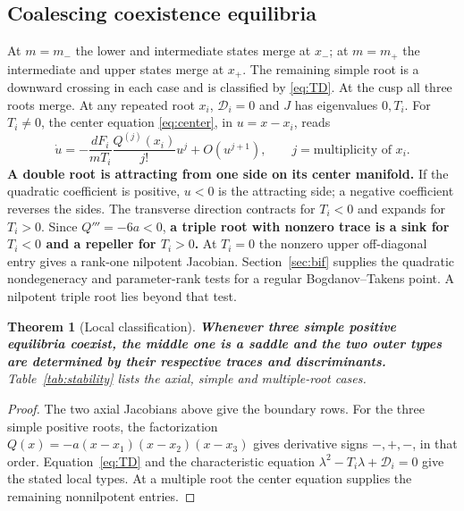\documentclass[12pt,a4paper,twoside,fleqn]{article}
\theoremstyle{journal}
\newtheorem{theorem}{Theorem}
\newcommand{\claim}[1]{{\normalfont\bfseries\boldmath #1}}
\newcommand{\Det}{\mathcal D}
\begin{document}
\subsection{Coalescing coexistence equilibria}
At \(m=m_-\) the lower and intermediate states merge at \(x_-\); at \(m=m_+\) the intermediate and upper states merge at \(x_+\). The remaining simple root is a downward crossing in each case and is classified by \eqref{eq:TD}. At the cusp all three roots merge. At any repeated root \(x_i\), \(\Det_i=0\) and \(J\) has eigenvalues \(0,T_i\). For \(T_i\ne0\), the center equation \eqref{eq:center}, in \(u=x-x_i\), reads
\[
 \dot u=-\frac{dF_i}{mT_i}\frac{Q^{(j)}(x_i)}{j!}u^j+O(u^{j+1}),
 \qquad j=\text{multiplicity of }x_i.
\]
\claim{A double root is attracting from one side on its center manifold.} If the quadratic coefficient is positive, \(u<0\) is the attracting side; a negative coefficient reverses the sides. The transverse direction contracts for \(T_i<0\) and expands for \(T_i>0\). Since \(Q'''=-6a<0\), \claim{a triple root with nonzero trace is a sink for \(T_i<0\) and a repeller for \(T_i>0\).} At \(T_i=0\) the nonzero upper off-diagonal entry gives a rank-one nilpotent Jacobian. Section~\ref{sec:bif} supplies the quadratic nondegeneracy and parameter-rank tests for a regular Bogdanov--Takens point. A nilpotent triple root lies beyond that test.

\begin{theorem}[Local classification]\label{thm:local}
\claim{Whenever three simple positive equilibria coexist, the middle one is a saddle and the two outer types are determined by their respective traces and discriminants.} Table~\ref{tab:stability} lists the axial, simple and multiple-root cases.
\end{theorem}
\begin{proof}
The two axial Jacobians above give the boundary rows. For the three simple positive roots, the factorization \(Q(x)=-a(x-x_1)(x-x_2)(x-x_3)\) gives derivative signs \(-,+,-\), in that order. Equation~\eqref{eq:TD} and the characteristic equation \(\lambda^2-T_i\lambda+\Det_i=0\) give the stated local types. At a multiple root the center equation supplies the remaining nonnilpotent entries.
\end{proof}
\end{document}
